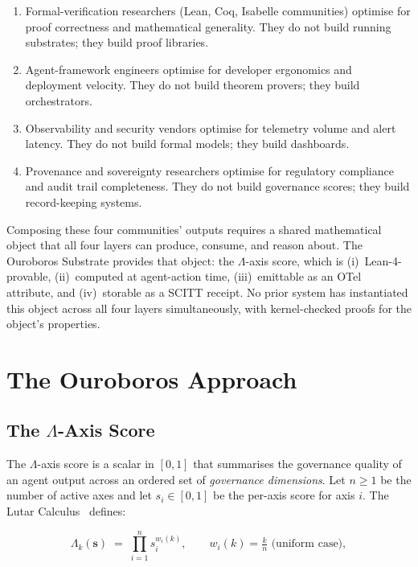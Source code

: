 \begin{enumerate}
  \item Formal-verification researchers (Lean, Coq, Isabelle communities)
    optimise for proof correctness and mathematical generality.
    They do not build running substrates; they build proof libraries.
  \item Agent-framework engineers optimise for developer ergonomics and
    deployment velocity.
    They do not build theorem provers; they build orchestrators.
  \item Observability and security vendors optimise for telemetry volume
    and alert latency.
    They do not build formal models; they build dashboards.
  \item Provenance and sovereignty researchers optimise for regulatory
    compliance and audit trail completeness.
    They do not build governance scores; they build record-keeping systems.
\end{enumerate}

Composing these four communities' outputs requires a shared mathematical
object that all four layers can produce, consume, and reason about.
The Ouroboros Substrate provides that object: the \(\Lambda\)-axis score,
which is (i)~Lean-4-provable, (ii)~computed at agent-action time,
(iii)~emittable as an OTel attribute, and (iv)~storable as a SCITT receipt.
No prior system has instantiated this object across all four layers
simultaneously, with kernel-checked proofs for the object's properties.


\section{The Ouroboros Approach}
\label{sec:approach}

\subsection{The \texorpdfstring{\(\Lambda\)}{Lambda}-Axis Score}
\label{ssec:lambda}

The \(\Lambda\)-axis score is a scalar in \([0,1]\) that summarises the
governance quality of an agent output across an ordered set of
\emph{governance dimensions}.
Let \(n \geq 1\) be the number of active axes and let
\(s_i \in [0,1]\) be the per-axis score for axis \(i\).
The Lutar Calculus~\cite{lutar2026v14} defines:

\begin{equation}
  \Lambda_k(\mathbf{s}) \;=\; \prod_{i=1}^{n} s_i^{w_i(k)}, \qquad
  w_i(k) = \tfrac{k}{n} \text{ (uniform case)},
  \label{eq:lambda}
\end{equation}

